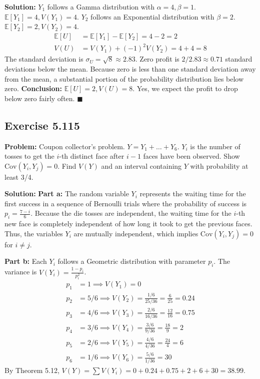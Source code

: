 \documentclass[11pt, a4paper]{article}
\theoremstyle{definition}
\theoremstyle{remark}
\newcommand{\E}{\mathbb{E}}
\begin{document}
\textbf{Solution:}
$Y_1$ follows a Gamma distribution with $\alpha=4, \beta=1$. $\E[Y_1] = 4, V(Y_1) = 4$.
$Y_2$ follows an Exponential distribution with $\beta=2$. $\E[Y_2] = 2, V(Y_2) = 4$.
\begin{align*}
\E[U] &= \E[Y_1] - \E[Y_2] = 4 - 2 = 2 \\
V(U) &= V(Y_1) + (-1)^2 V(Y_2) = 4 + 4 = 8
\end{align*}
The standard deviation is $\sigma_U = \sqrt{8} \approx 2.83$.
Zero profit is $2 / 2.83 \approx 0.71$ standard deviations below the mean. Because zero is less than one standard deviation away from the mean, a substantial portion of the probability distribution lies below zero.
\textbf{Conclusion:} $\E[U] = 2, V(U) = 8$. Yes, we expect the profit to drop below zero fairly often. $\blacksquare$

\subsection{Exercise 5.115}
\textbf{Problem:} Coupon collector's problem. $Y = Y_1 + \dots + Y_6$. $Y_i$ is the number of tosses to get the $i$-th distinct face after $i-1$ faces have been observed. Show $\text{Cov}(Y_i, Y_j) = 0$. Find $V(Y)$ and an interval containing $Y$ with probability at least 3/4.

\textbf{Solution:}
\textbf{Part a:} The random variable $Y_i$ represents the waiting time for the first success in a sequence of Bernoulli trials where the probability of success is $p_i = \frac{7-i}{6}$. Because the die tosses are independent, the waiting time for the $i$-th new face is completely independent of how long it took to get the previous faces. Thus, the variables $Y_i$ are mutually independent, which implies $\text{Cov}(Y_i, Y_j) = 0$ for $i \neq j$.

\textbf{Part b:} Each $Y_i$ follows a Geometric distribution with parameter $p_i$. The variance is $V(Y_i) = \frac{1-p_i}{p_i^2}$.
\begin{align*}
p_1 &= 1 \implies V(Y_1) = 0 \\
p_2 &= 5/6 \implies V(Y_2) = \frac{1/6}{25/36} = \frac{6}{25} = 0.24 \\
p_3 &= 4/6 \implies V(Y_3) = \frac{2/6}{16/36} = \frac{12}{16} = 0.75 \\
p_4 &= 3/6 \implies V(Y_4) = \frac{3/6}{9/36} = \frac{18}{9} = 2 \\
p_5 &= 2/6 \implies V(Y_5) = \frac{4/6}{4/36} = \frac{24}{4} = 6 \\
p_6 &= 1/6 \implies V(Y_6) = \frac{5/6}{1/36} = 30
\end{align*}
By Theorem 5.12, $V(Y) = \sum V(Y_i) = 0 + 0.24 + 0.75 + 2 + 6 + 30 = 38.99$.
\end{document}
